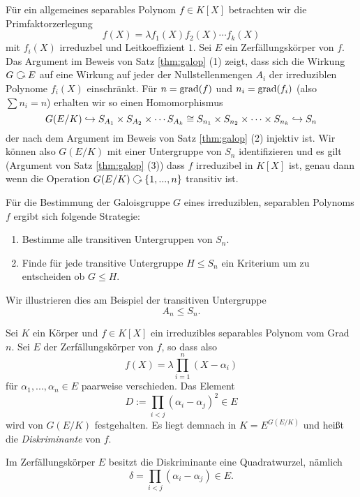 \documentclass{book}
\begin{document}
\begin{rem}
    \label{rem:allgemeinpermutation}
    Für ein allgemeines separables Polynom $f \in K[X]$ betrachten wir die
    Primfaktorzerlegung
    \[
        f(X) = \lambda f_1(X) f_2(X) \cdots f_k(X)
    \]
    mit $f_i(X)$ irreduzbel und Leitkoeffizient $1$. Sei $E$ ein
    Zerfällungskörper von $f$. Das Argument im Beweis von Satz \ref{thm:galop} (1) 
    zeigt, dass sich die Wirkung $G \actson E$ auf eine Wirkung auf jeder der
    Nullstellenmengen $A_i$ der irreduziblen Polynome $f_i(X)$ einschränkt. Für
    $n = \operatorname{grad}(f)$ und $n_i = \operatorname{grad}(f_i)$ (also $\sum n_i = n$) erhalten wir so einen Homomorphismus
    \[
        G(E/K) \hookrightarrow S_{A_1} \times S_{A_2} \times  \cdots S_{A_k} \cong S_{n_1}
        \times S_{n_2} \times \cdots \times S_{n_k} \hookrightarrow S_n
    \]
    der nach dem Argument im Beweis von Satz \ref{thm:galop} (2) injektiv ist.
    Wir können also $G(E/K)$ mit einer Untergruppe von $S_n$ identifizieren und
    es gilt (Argument von Satz \ref{thm:galop} (3)) dass $f$ irreduzibel in
    $K[X]$ ist, genau dann wenn die Operation $G(E/K) \actson \{1,
    ..., n\}$ transitiv ist. 
\end{rem}

Für die Bestimmung der Galoisgruppe $G$ eines irreduziblen, separablen Polynoms
$f$ ergibt sich folgende Strategie:
\begin{enumerate}
    \item Bestimme alle transitiven Untergruppen von $S_n$.
    \item Finde für jede transitive Untergruppe $H \le S_n$ ein Kriterium um zu
        entscheiden ob $G \le H$. 
\end{enumerate}
Wir illustrieren dies am Beispiel der transitiven Untergruppe 
\[
    A_n \le S_n.
\]

\begin{defi}
    \label{defi:diskriminante}
    Sei $K$ ein Körper und $f \in K[X]$ ein irreduzibles separables Polynom vom Grad $n$. Sei $E$ der Zerfällungskörper von $f$, so dass also
    \[
        f(X) = \lambda \prod_{i=1}^n (X - \alpha_i)
    \]
    für $\alpha_1, ..., \alpha_n \in E$ paarweise verschieden. Das Element
    \[
        D := \prod_{i < j } (\alpha_i - \alpha_j)^2 \in E
    \]
    wird von $G(E/K)$ festgehalten. Es liegt demnach in $K = E^{G(E/K)}$ und
    heißt die \emph{Diskriminante} von $f$. 
\end{defi}

\begin{rem}
    \label{rem:diskroot}
    Im Zerfällungskörper $E$ besitzt die Diskriminante eine Quadratwurzel, nämlich
    \[
        \delta = \prod_{i < j} (\alpha_i - \alpha_j) \in E.
    \]
\end{rem}
\end{document}
